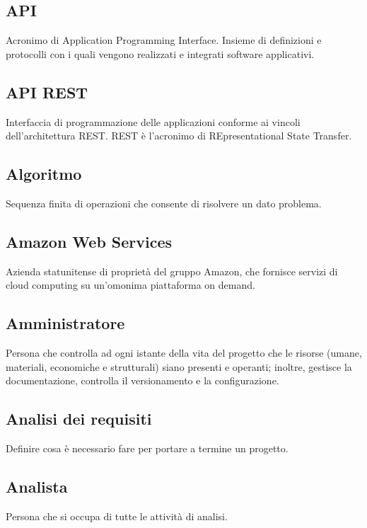 \documentclass[../glossario.tex]{subfiles}
\begin{document}
\subsection*{API}
Acronimo di Application Programming Interface. Insieme di definizioni e protocolli con i quali vengono realizzati e integrati software applicativi.

\subsection*{API REST}
Interfaccia di programmazione delle applicazioni conforme ai vincoli dell'architettura REST. REST è l'acronimo di REpresentational State Transfer.

\subsection*{Algoritmo}
Sequenza finita di operazioni che consente di risolvere un dato problema.

\subsection*{Amazon Web Services}
Azienda statunitense di proprietà del gruppo Amazon, che fornisce servizi di cloud computing su un'omonima piattaforma on demand.

\subsection*{Amministratore}
Persona che controlla ad ogni istante della vita del progetto che le risorse (umane, materiali, economiche e strutturali) siano presenti e operanti; inoltre, gestisce la documentazione, controlla il versionamento e la configurazione.

\subsection*{Analisi dei requisiti}
Definire cosa è necessario fare per portare a termine un progetto.

\subsection*{Analista}
Persona che si occupa di tutte le attività di analisi.
\end{document}
